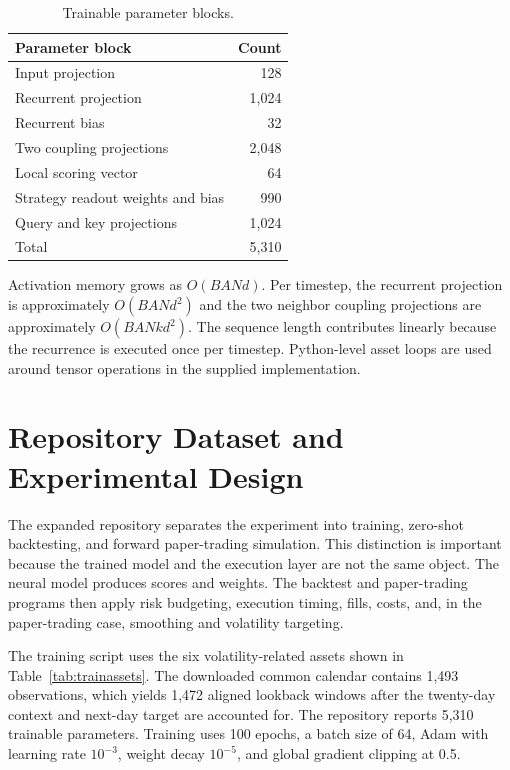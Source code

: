 \documentclass[10pt,a4paper,twocolumn]{article}
\begin{document}
\begin{table}[t]
\centering
\caption{Trainable parameter blocks.}
\label{tab:params}
\small
\begin{tabular}{@{}L{0.62\columnwidth}r@{}}
\toprule
Parameter block & Count \\
\midrule
Input projection & 128 \\
Recurrent projection & 1,024 \\
Recurrent bias & 32 \\
Two coupling projections & 2,048 \\
Local scoring vector & 64 \\
Strategy readout weights and bias & 990 \\
Query and key projections & 1,024 \\
\midrule
Total & 5,310 \\
\bottomrule
\end{tabular}
\end{table}

Activation memory grows as $O(BANd)$. Per timestep, the recurrent projection is approximately $O(BANd^2)$ and the two neighbor coupling projections are approximately $O(BANkd^2)$. The sequence length contributes linearly because the recurrence is executed once per timestep. Python-level asset loops are used around tensor operations in the supplied implementation.


\section{Repository Dataset and Experimental Design}
The expanded repository separates the experiment into training, zero-shot backtesting, and forward paper-trading simulation. This distinction is important because the trained model and the execution layer are not the same object. The neural model produces scores and weights. The backtest and paper-trading programs then apply risk budgeting, execution timing, fills, costs, and, in the paper-trading case, smoothing and volatility targeting.

The training script uses the six volatility-related assets shown in Table~\ref{tab:trainassets}. The downloaded common calendar contains 1,493 observations, which yields 1,472 aligned lookback windows after the twenty-day context and next-day target are accounted for. The repository reports 5,310 trainable parameters. Training uses 100 epochs, a batch size of 64, Adam with learning rate $10^{-3}$, weight decay $10^{-5}$, and global gradient clipping at 0.5.
\end{document}
